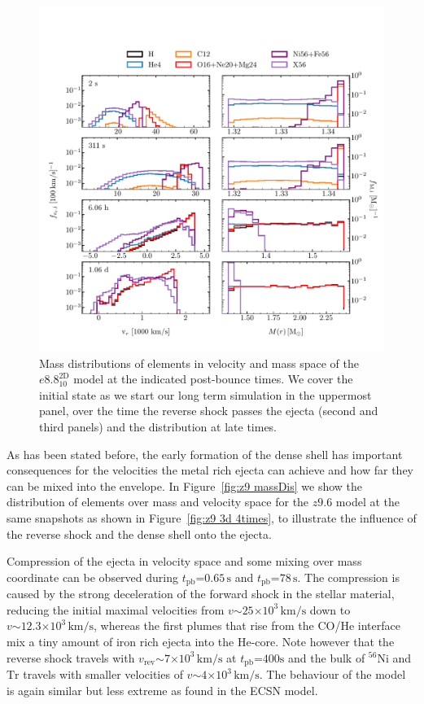 \documentclass[fleqn,usenatbib]{mnras}
\newcommand{\nickel}{\ensuremath{\mathrm{^{56}Ni}}\xspace}
\newcommand{\tracer}{\ensuremath{\mathrm{Tr}}\xspace}
\newcommand{\s}{\ensuremath{\text{s}}}
\begin{document}
\begin{figure}
 \centering
 \includegraphics[width=\textwidth,trim=0cm 0.6cm 0cm 1cm, clip]{pic/e8_2d_10_massDis_mvr_mas_4times_paper.pdf}
 \caption{Mass distributions of elements in velocity and mass space  of the $e8.8^{\mathrm{2D}}_{10}$ model at the indicated post-bounce times. We cover the initial state as we start our long term simulation in the uppermost panel, over the time the reverse shock passes the ejecta (second and third panels) and the distribution at late times.}
 \label{fig:e8 massDis 4times}
\end{figure}
As has been stated before, the early formation of the dense shell has important consequences for the velocities the metal rich ejecta can achieve and how far they can be mixed into the envelope.
In Figure~\ref{fig:z9 massDis} we show the distribution of elements over mass and velocity space for the $z9.6$ model at the same snapshots as shown in Figure~\ref{fig:z9 3d  4times}, to illustrate the influence of the reverse shock and the dense shell onto the ejecta.

Compression of the ejecta in velocity space and some mixing over mass coordinate can be observed during $t_{\mathrm{pb}}\mathord{=}0.65\,\s$ and $t_{\mathrm{pb}}\mathord{=}78\,\s$. The compression is caused by the strong deceleration of the forward shock in the stellar material, reducing the initial maximal velocities from $v\mathord{\sim} 25\mathord{\times}10^3\,\mathrm{km/s}$ down to $v\mathord{\sim} 12.3\mathord{\times}10^3\,\mathrm{km/s}$, whereas the first plumes that rise from the CO/He interface mix a tiny amount of iron rich ejecta into the He-core. Note however that the reverse shock travels with $v_{\mathrm{rev}}\mathord{\sim} 7\mathord{\times}10^3\,\mathrm{km/s}$ at $t_{\mathrm{pb}}\mathord{=}400\s$ and the bulk of $\nickel$ and $\tracer$ travels with smaller velocities of $v\mathord{\sim} 4\mathord{\times}10^3\,\mathrm{km/s}$. The behaviour of the model is again similar but less extreme as found in the ECSN model.
\end{document}
